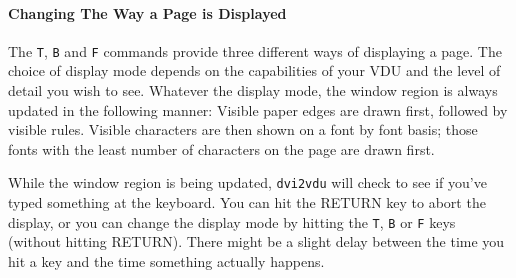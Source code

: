 \paragraph{Changing The Way a Page is Displayed}

The \verb+T+, \verb+B+ and \verb+F+ commands provide three different ways of displaying a
page.  The choice of display mode depends on the capabilities of your VDU
and the level of detail you wish to see.
Whatever the display mode, the window region
is always updated in the following manner:
Visible paper edges are drawn first, followed by visible rules.
Visible characters are then shown on a font by font basis; those fonts
with the least number of characters on the page are drawn first.

While the window region is being updated, {{\tt dvi2vdu}} will check to see if
you've typed something at the keyboard.
You can hit the RETURN key to abort the display,
or you can change the display mode by hitting the \verb+T+, \verb+B+ or \verb+F+ keys
(without hitting RETURN).  There might be a slight delay between the time
you hit a key and the time something actually happens.

